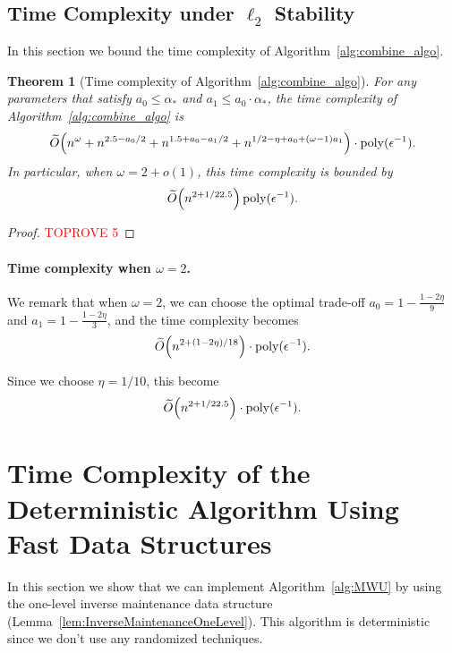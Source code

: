 \documentclass[11pt]{article}
\newtheorem{theorem}{Theorem}[section]
\let\originalleft\left
\let\originalright\right
\renewcommand{\left}{\mathopen{}\mathclose\bgroup\originalleft}
\renewcommand{\right}{\aftergroup\egroup\originalright}
\newcommand{\wt}{\widetilde}
\DeclareMathOperator*{\poly}{{\mathrm{poly}}}
\begin{document}
\subsection{Time Complexity under \texorpdfstring{$\ell_2$}{} Stability}\label{sec:RuntimeL2}
In this section we bound the time complexity of Algorithm~\ref{alg:combine_algo}.
\begin{theorem}[Time complexity of Algorithm~\ref{alg:combine_algo}]\label{thm:time_combine}
For any parameters that satisfy $a_0 \leq \alpha_*$ and $a_1 \leq a_0 \cdot \alpha_*$, the time complexity of Algorithm~\ref{alg:combine_algo} is
\begin{align*}
\wt{O}\left(n^{\omega} + n^{2.5-a_0/2} + n^{1.5+a_0-a_1/2} + n^{1/2-\eta + a_0 + (\omega-1) a_1} \right) \cdot \poly(\epsilon^{-1}).
\end{align*}
In particular, when $\omega = 2 + o(1)$, this time complexity is bounded by
\[
\wt{O}\left(n^{2+1/22.5} \right) \poly(\epsilon^{-1}).
\]
\end{theorem}
\begin{proof}\textcolor{red}{TOPROVE 5}\end{proof}




\paragraph{Time complexity when $\omega = 2$.}
We remark that when $\omega = 2$, we can choose the optimal trade-off $a_0 = 1 - \frac{1 - 2 \eta}{9}$ and $a_1 = 1 - \frac{1 - 2 \eta}{3}$, and the time complexity becomes
\begin{align*}
\wt{O}\left(n^{2 + (1 - 2\eta) / 18} \right) \cdot \poly(\epsilon^{-1}).
\end{align*}

Since we choose $\eta = 1/10$, this become 
\begin{align*}
\wt{O}\left(n^{2 + 1 / 22.5} \right) \cdot \poly(\epsilon^{-1}).
\end{align*}

 \section{Time Complexity of the Deterministic Algorithm Using Fast Data Structures}\label{sec:time_deterministic}
In this section we show that we can implement Algorithm~\ref{alg:MWU} by using the one-level inverse maintenance data structure (Lemma~\ref{lem:InverseMaintenanceOneLevel}). This algorithm is deterministic since we don't use any randomized techniques.
\end{document}
